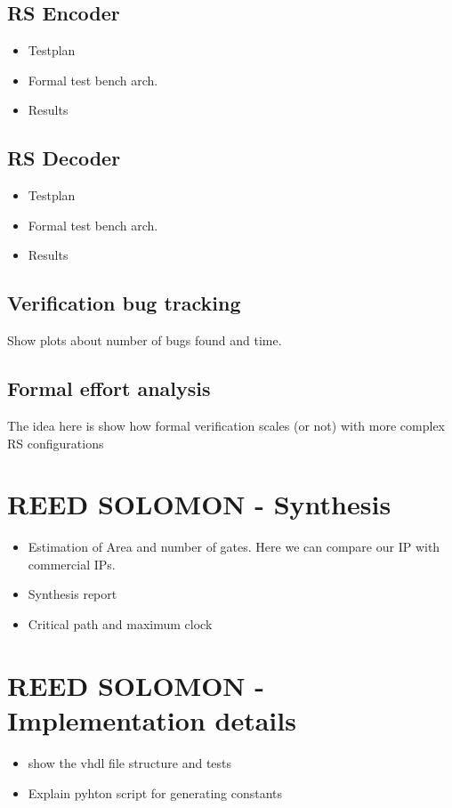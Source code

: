 \documentclass[conference]{IEEEtran}
\begin{document}
\subsection{RS Encoder}
\begin{itemize}
	\item Testplan
	\item Formal test bench arch.
	\item Results
\end{itemize}

\subsection{RS Decoder}
\begin{itemize}
	\item Testplan
	\item Formal test bench arch.
	\item Results
\end{itemize}

\subsection{Verification bug tracking}
Show plots about number of bugs found and time.

\subsection{Formal effort analysis}
The idea here is show how formal verification scales (or not) with more complex RS configurations


\section{REED SOLOMON - Synthesis}
\begin{itemize}
	\item Estimation of Area and number of gates. Here we can compare our IP with commercial IPs.
	\item Synthesis report
	\item Critical path and maximum clock
\end{itemize}

\section{REED SOLOMON - Implementation details}
\begin{itemize}
	\item show the vhdl file structure and tests
	\item Explain pyhton script for generating constants
\end{itemize}
\end{document}
